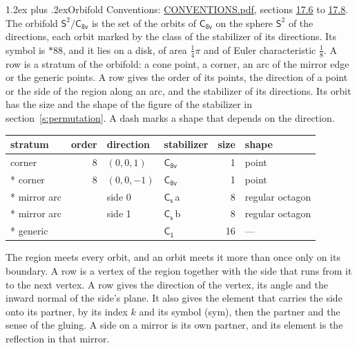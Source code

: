 \documentclass[10pt,a4paper]{article}
\makeatletter
\renewcommand\section{\@startsection{section}{1}{\z@}{-3ex plus -1ex minus -.2ex}%
  {1.2ex plus .2ex}{\normalfont\large\sffamily\bfseries\color{parttitle}}}
\numberwithin{equation}{section}
\newcommand{\grp}[1]{\mathsf{#1}}
\newcommand{\orbname}[1]{#1}
\newcommand{\clsletter}[1]{\,{\scriptsize\color{black!55}#1}}
\newcommand{\dirvec}[3]{(#1, #2, #3)}
\newcommand{\twosphere}{\mathsf{S}^{2}}
\makeatother
\begin{document}
\section{Orbifold}\label{s:orbifold}
Conventions: \href{../../CONVENTIONS.pdf}{CONVENTIONS.pdf}, sections \href{../../CONVENTIONS.pdf\#conv.17.6}{17.6} to \href{../../CONVENTIONS.pdf\#conv.17.8}{17.8}.
The orbifold $\twosphere/\grp{C_{8v}}$ is the set of the orbits of $\grp{C_{8v}}$ on the sphere $\twosphere$ of the directions, each orbit marked by the class of the stabilizer of its directions. Its symbol is $\orbname{{\ast}88}$, and it lies on a disk, of area $\tfrac{1}{4}\pi$ and of Euler characteristic $\tfrac{1}{8}$.
\leavevmode\label{n:head.stratum}\label{n:head.order.point}\label{n:head.direction}\label{n:head.stabilizer}\label{n:head.size.orbit}\label{n:head.shape}A row is a stratum of the orbifold: a cone point, a corner, an arc of the mirror edge or the generic points. A row gives the order of its points, the direction of a point or the side of the region along an arc, and the stabilizer of its directions. Its orbit has the size and the shape of the figure of the stabilizer in section~\ref{s:permutation}. A dash marks a shape that depends on the direction.
{\small\setlength{\tabcolsep}{4pt}\begin{longtable}{@{}lrllrl@{}}\toprule
stratum & order & direction & stabilizer & size & shape\\\midrule\endhead
\bottomrule\endfoot\endlastfoot
corner & 8 & $\dirvec{0}{0}{1}$ & \href{C8v.pdf}{$\grp{C_{8v}}$} & 1 & point\\*
corner & 8 & $\dirvec{0}{0}{-1}$ & \href{C8v.pdf}{$\grp{C_{8v}}$} & 1 & point\\*
mirror arc &  & side 0 & \href{C1v.pdf}{$\grp{C_{s}}$}\clsletter{a} & 8 & regular octagon\\*
mirror arc &  & side 1 & \href{C1v.pdf}{$\grp{C_{s}}$}\clsletter{b} & 8 & regular octagon\\*
generic &  &  & \href{C1.pdf}{$\grp{C_{1}}$} & 16 & ---\\
\bottomrule\end{longtable}}
\leavevmode\label{n:head.vertex.region}\label{n:head.angle}\label{n:head.normal.side}\label{n:head.partner}\label{n:head.sense}The region meets every orbit, and an orbit meets it more than once only on its boundary. A row is a vertex of the region together with the side that runs from it to the next vertex. A row gives the direction of the vertex, its angle and the inward normal of the side's plane. It also gives the element that carries the side onto its partner, by its index $k$ and its symbol (sym), then the partner and the sense of the gluing. A side on a mirror is its own partner, and its element is the reflection in that mirror.
\end{document}
